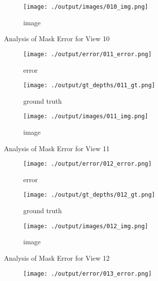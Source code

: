 \documentclass{article}
\begin{document}
\begin{figure}
	\hfill
	\centering
	\begin{subfigure}{0.3\textwidth}
		\centering
		\texttt{[image: ./output/images/010\_img.png]}
		\caption{image}
		\label{fig:img10}
	\end{subfigure}
	\hfill
	\caption{Analysis of Mask Error for View 10}
	\label{fig:error_analys10}
\end{figure}\begin{figure}
	\centering
	\begin{subfigure}{0.3\textwidth}
		\centering
		\texttt{[image: ./output/error/011\_error.png]}
		\caption{error}
		\label{fig:error11}
	\end{subfigure}
	\hfill
	\centering
	\begin{subfigure}{0.3\textwidth}
		\centering
		\texttt{[image: ./output/gt\_depths/011\_gt.png]}
		\caption{ground truth}
		\label{fig:gt11}
	\end{subfigure}
	\hfill
	\centering
	\begin{subfigure}{0.3\textwidth}
		\centering
		\texttt{[image: ./output/images/011\_img.png]}
		\caption{image}
		\label{fig:img11}
	\end{subfigure}
	\hfill
	\caption{Analysis of Mask Error for View 11}
	\label{fig:error_analys11}
\end{figure}\begin{figure}
	\centering
	\begin{subfigure}{0.3\textwidth}
		\centering
		\texttt{[image: ./output/error/012\_error.png]}
		\caption{error}
		\label{fig:error12}
	\end{subfigure}
	\hfill
	\centering
	\begin{subfigure}{0.3\textwidth}
		\centering
		\texttt{[image: ./output/gt\_depths/012\_gt.png]}
		\caption{ground truth}
		\label{fig:gt12}
	\end{subfigure}
	\hfill
	\centering
	\begin{subfigure}{0.3\textwidth}
		\centering
		\texttt{[image: ./output/images/012\_img.png]}
		\caption{image}
		\label{fig:img12}
	\end{subfigure}
	\hfill
	\caption{Analysis of Mask Error for View 12}
	\label{fig:error_analys12}
\end{figure}\begin{figure}
	\centering
	\begin{subfigure}{0.3\textwidth}
		\centering
		\texttt{[image: ./output/error/013\_error.png]}

\end{subfigure}
\end{figure}
\end{document}
